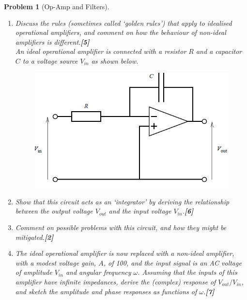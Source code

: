 \documentclass[a4paper]{article}
\theoremstyle{new}
\newtheorem{qns}{Problem}[subsection]
\begin{document}
\newpage
\begin{qns}[Op-Amp and Filters]\leavevmode
\begin{enumerate}[label=(\roman*)]
\item Discuss the rules (sometimes called ‘golden rules’) that apply to idealised operational amplifiers, and comment on how the behaviour of non-ideal amplifiers is different.\hfill\textbf{[5]}\\[5pt]
An ideal operational amplifier is connected with a resistor $R$ and a capacitor $C$ to a voltage source $V_{in}$ as shown below.
\begin{figure}[H]
    \centering
    \includegraphics[scale=0.75]{2010P2D13Q.PNG}
\end{figure}
\item Show that this circuit acts as an ‘integrator’ by deriving the relationship between the output voltage $V_{out}$ and the input voltage $V_{in}$.\hfill\textbf{[6]}
\item Comment on possible problems with this circuit, and how they might be mitigated.\hfill\textbf{[2]}
\item The ideal operational amplifier is now replaced with a non-ideal amplifier, with a modest voltage gain, $A$, of 100, and the input signal is an AC voltage of amplitude $V_{in}$ and angular frequency $\omega$. Assuming that the inputs of this amplifier have infinite impedances, derive the (complex) response of $V_{out}/V_{in}$, and sketch the amplitude and phase responses as functions of $\omega$.\hfill\textbf{[7]}
\end{enumerate}
\end{qns}
\end{document}
